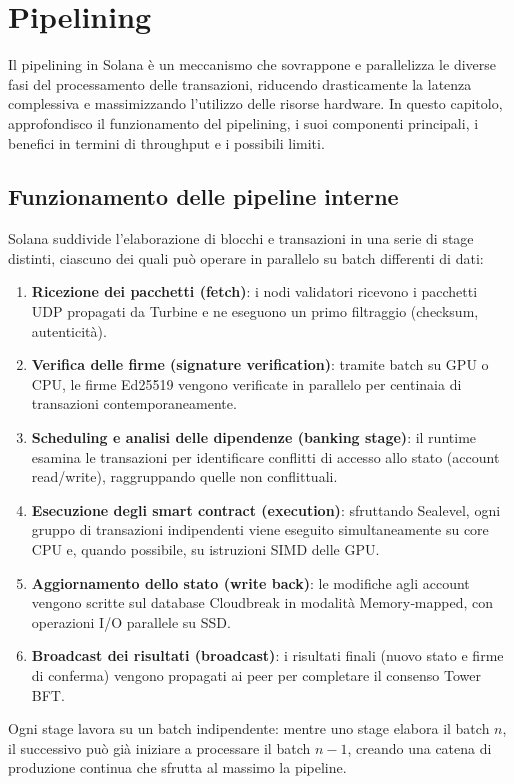 \documentclass[a4paper,12pt]{report}
\begin{document}
	\section{Pipelining}
	
	Il pipelining in Solana è un meccanismo che sovrappone e parallelizza le diverse fasi del processamento delle transazioni, riducendo drasticamente la latenza complessiva e massimizzando l’utilizzo delle risorse hardware. In questo capitolo, approfondisco il funzionamento del pipelining, i suoi componenti principali, i benefici in termini di throughput e i possibili limiti.
	
	\subsection{Funzionamento delle pipeline interne}
	Solana suddivide l’elaborazione di blocchi e transazioni in una serie di stage distinti, ciascuno dei quali può operare in parallelo su batch differenti di dati:
	\begin{enumerate}
		\item \textbf{Ricezione dei pacchetti (fetch)}: i nodi validatori ricevono i pacchetti UDP propagati da Turbine e ne eseguono un primo filtraggio (checksum, autenticità).
		\item \textbf{Verifica delle firme (signature verification)}: tramite batch su GPU o CPU, le firme Ed25519 vengono verificate in parallelo per centinaia di transazioni contemporaneamente.
		\item \textbf{Scheduling e analisi delle dipendenze (banking stage)}: il runtime esamina le transazioni per identificare conflitti di accesso allo stato (account read/write), raggruppando quelle non conflittuali.
		\item \textbf{Esecuzione degli smart contract (execution)}: sfruttando Sealevel, ogni gruppo di transazioni indipendenti viene eseguito simultaneamente su core CPU e, quando possibile, su istruzioni SIMD delle GPU.
		\item \textbf{Aggiornamento dello stato (write back)}: le modifiche agli account vengono scritte sul database Cloudbreak in modalità Memory‑mapped, con operazioni I/O parallele su SSD.
		\item \textbf{Broadcast dei risultati (broadcast)}: i risultati finali (nuovo stato e firme di conferma) vengono propagati ai peer per completare il consenso Tower BFT.
	\end{enumerate}
	Ogni stage lavora su un batch indipendente: mentre uno stage elabora il batch \(n\), il successivo può già iniziare a processare il batch \(n-1\), creando una catena di produzione continua che sfrutta al massimo la pipeline.
	
\end{document}
